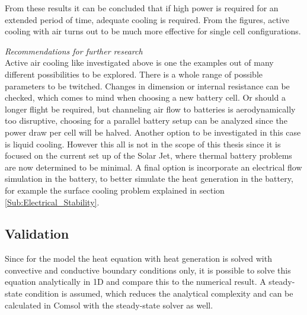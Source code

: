 From these results it can be concluded that if high power is required for an extended period of time, adequate cooling is required. From the figures, active cooling with air turns out to be much more effective for single cell configurations.

\textit{Recommendations for further research}\\
Active air cooling like investigated above is one the examples out of many different possibilities to be explored. There is a whole range of possible parameters to be twitched. Changes in dimension or internal resistance can be checked, which comes to mind when choosing a new battery cell. Or should a longer flight be required, but channeling air flow to batteries is aerodynamically too disruptive, choosing for a parallel battery setup can be analyzed since the power draw per cell will be halved. Another option to be investigated in this case is liquid cooling. However this all is not in the scope of this thesis since it is focused on the current set up of the Solar Jet, where thermal battery problems are now determined to be minimal. A final option is incorporate an electrical flow simulation in the battery, to better simulate the heat generation in the battery, for example the surface cooling problem explained in section \ref{Sub:Electrical_Stability}.

\subsection{Validation}
\label{Sub:Validation}
Since for the model the heat equation with heat generation is solved with convective and conductive boundary conditions only,  it is possible to solve this equation analytically in 1D and compare this to the numerical result. A steady-state condition is assumed, which reduces the analytical complexity and can be calculated in Comsol with the steady-state solver as well.

